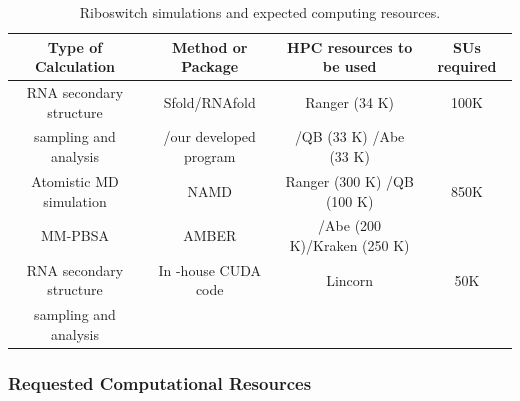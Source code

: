 \documentclass[a4paper,10pt]{article}
\begin{document}







\begin{table}[h]
\begin{center}
  \caption{Riboswitch simulations and expected computing resources.  }
\label{table:systems}
\begin{tabular}{| c | c | c | c |}
\hline
Type of Calculation &   Method or Package  &    HPC resources to be used & SUs required \\
\hline \hline
RNA secondary structure &
Sfold/RNAfold& Ranger (34 K) & 100K\\ 
sampling and analysis  & /our developed program  & /QB (33 K) /Abe (33 K) & \\  \hline
Atomistic MD simulation & NAMD  & Ranger (300 K) /QB (100 K)  & 850K \\  
MM-PBSA        & AMBER    & /Abe (200 K)/Kraken (250 K) &  \\ \hline
RNA secondary structure & In -house CUDA code & Lincorn & 50K \\
 sampling and analysis &   
&  &  \\
\hline
\end{tabular}
\end{center}
\end{table}

\subsubsection*{Requested Computational Resources}
\end{document}
